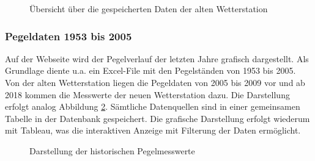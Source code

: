 \begin{figure}[h!]
	\centering
	\caption{Übersicht über die gespeicherten Daten der alten Wetterstation}
	\label{img:histAlt}
\end{figure}



\subsubsection{Pegeldaten 1953 bis 2005}
\label{subsec:pegelhistory}
Auf der Webseite wird der Pegelverlauf der letzten Jahre grafisch dargestellt. Als Grundlage diente u.a. ein Excel-File mit den Pegelständen von 1953 bis 2005. Von der alten Wetterstation liegen die Pegeldaten von 2005 bis 2009 vor und ab 2018 kommen die Messwerte der neuen Wetterstation dazu. Die Darstellung erfolgt analog Abbildung \ref{img:histPegel}. Sämtliche Datenquellen sind in einer gemeinsamen Tabelle in der Datenbank gespeichert. Die grafische Darstellung erfolgt wiederum mit Tableau, was die interaktiven Anzeige mit Filterung der Daten ermöglicht.

\begin{figure}[h!]
	\centering
	\caption{Darstellung der historischen Pegelmesswerte}
	\label{img:histPegel}
\end{figure}



